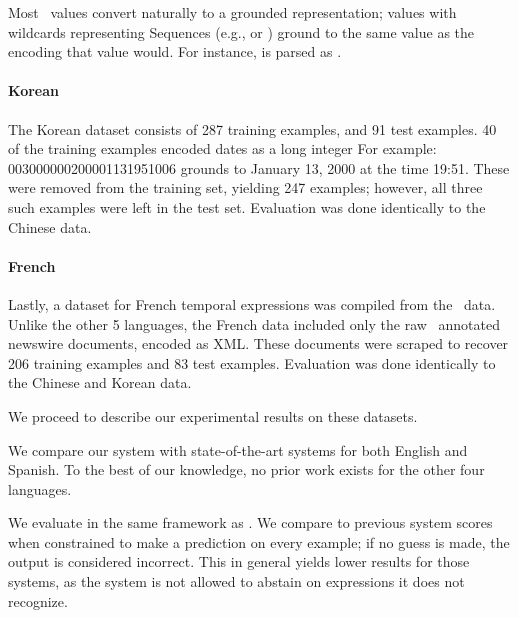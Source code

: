 Most \timex\ values convert naturally to a grounded representation; values
  with wildcards representing Sequences (e.g.,  or )
  ground to the same value as the  encoding that value would.
For instance,  is parsed as .

\paragraph{Korean}
The Korean dataset consists of 287 training examples, and 91 test examples.
40 of the training examples encoded dates as a long integer
For example: 003000000200001131951006 grounds to January 13, 2000 at the time
  19:51.
These were removed from the training set, yielding 247 examples; however,
  all three such examples were left in the test set.
Evaluation was done identically to the Chinese data.

\paragraph{French}
Lastly, a dataset for French temporal expressions was compiled from the
  \tempeval\ data.
Unlike the other 5 languages, the French data included only the raw 
  \timex\ annotated newswire documents, encoded as XML.
These documents were scraped to recover 206 training examples and 83 test
  examples.
Evaluation was done identically to the Chinese and Korean data.

We proceed to describe our experimental results on these datasets.

We compare our system with state-of-the-art systems for both English and
  Spanish.
To the best of our knowledge, no prior work exists for the other four languages.

We evaluate in the same framework as \me.
We compare to 
	previous system scores when constrained to make a prediction on every
	example; if no guess is made, the output is considered incorrect.
This in general yields lower results for those systems,
  as the system is not allowed to
	abstain on expressions it does not recognize.


